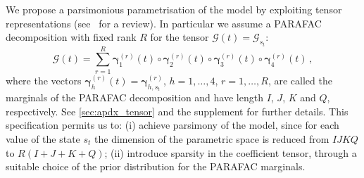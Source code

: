 \documentclass[12pt,a4paper]{article}
\theoremstyle{custom}
\begin{document}
We propose a parsimonious parametrisation of the model by exploiting tensor representations (see~\cite{KoldaBader09} for a review). In particular we assume a PARAFAC decomposition with fixed rank $R$ for the tensor $\mathcal{G}(t) = \mathcal{G}_{s_t}$:
\begin{equation}
\mathcal{G}(t) = \sum_{r=1}^R \boldsymbol{\gamma}_{1}^{(r)}(t) \circ \boldsymbol{\gamma}_{2}^{(r)}(t) \circ \boldsymbol{\gamma}_{3}^{(r)}(t) \circ \boldsymbol{\gamma}_{4}^{(r)}(t) \, ,
\label{eq:CP_decomposition}
\end{equation}
where the vectors $\boldsymbol{\gamma}_{h}^{(r)}(t) = \boldsymbol{\gamma}_{h,s_t}^{(r)}$, $h=1,\ldots,4$, $r=1,\ldots,R$, are called the marginals of the PARAFAC decomposition and have length $I$, $J$, $K$ and $Q$, respectively. See \autoref{sec:apdx_tensor} and the supplement for further details. This specification permits us to: (i) achieve parsimony of the model, since for each value of the state $s_t$ the dimension of the parametric space is reduced from $IJKQ$ to $R(I+J+K+Q)$; (ii) introduce sparsity in the coefficient tensor, through a suitable choice of the prior distribution for the PARAFAC marginals.
\end{document}

